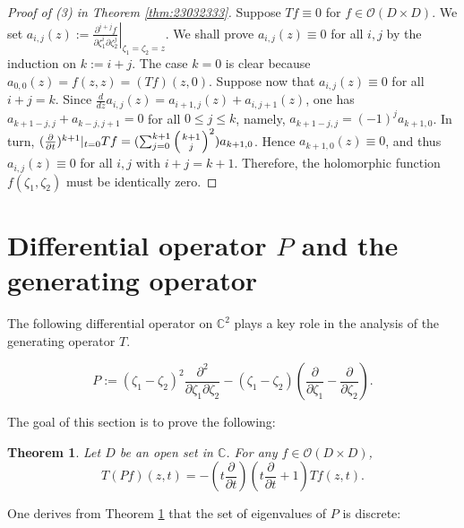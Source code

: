 \documentclass[12pt,leqno]{amsart}
\theoremstyle{plain}
\newtheorem{theorem}[thm]{Theorem}
\theoremstyle{definition}
\begin{document}
\begin{proof}
[Proof of (3) in Theorem \ref{thm:23032333}]
Suppose $T f \equiv 0$ for $f \in {\mathcal{O}}(D \times D)$.  
We set $a_{i,j}(z):=
\left. \frac{\partial^{i+j} f}{\partial \zeta_1^i \partial \zeta_2^j}\right|_{\zeta_1=\zeta_2=z}$.  
We shall prove $a_{i,j}(z)\equiv 0$
 for all $i,j$ by the induction on $k:=i+j$.  
The case $k=0$ is clear 
 because $a_{0,0}(z)=f(z,z)=(T f)(z,0)$.  
Suppose now that $a_{i,j}(z) \equiv 0$ for all $i+j=k$.  
Since $\frac{d}{dz} a_{i,j}(z)= a_{i+1,j}(z)+ a_{i,j+1}(z)$,
 one has $a_{k+1-j,j}+a_{k-j,j+1}=0$
 for all $0 \le j \le k$, 
 namely, 
 $a_{k+1-j,j}=(-1)^j a_{k+1,0}$.  
In turn, 
 $(\frac{\partial}{\partial t})^{k+1}|_{t=0} T f =(\sum_{j=0}^{k+1} \left({k+1} \atop j\right)^2) a_{k+1,0}$.  
Hence $a_{k+1,0}(z) \equiv 0$, 
 and thus $a_{i,j}(z) \equiv 0$ for all $i,j$
 with $i+j=k+1$.  
Therefore,
 the holomorphic function $f(\zeta_1, \zeta_2)$ must be identically zero.  
\end{proof}


\section{Differential operator $P$ and the generating operator}
\label{sec:P}

The following differential operator
 on ${\mathbb{C}}^2$ plays a key role 
 in the analysis
 of the generating operator $T$.  

\begin{equation}
\label{eqn:23031847}
P:=
(\zeta_1-\zeta_2)^2 
\frac{\partial^2}{\partial \zeta_1 \partial \zeta_2}
-
(\zeta_1-\zeta_2) 
(\frac{\partial}{\partial \zeta_1}-\frac{\partial}{\partial \zeta_2}).  
\end{equation}



The goal of this section is to prove the following:

\begin{theorem}
\label{thm:Luminy0316}
Let $D$ be an open set in ${\mathbb{C}}$.  
For any $f \in {\mathcal{O}}(D \times D)$, 
\[
T(P f)(z,t) = -(t \frac{\partial}{\partial t})(t \frac{\partial}{\partial t}+1)
T f(z,t).  
\]
\end{theorem}



One derives from Theorem \ref{thm:Luminy0316}
 that the set of eigenvalues of $P$ is discrete:
\end{document}
